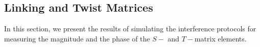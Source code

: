 \documentclass[two column]{article}
\begin{document}




\subsection{Linking and Twist Matrices}\label{sec:num:intef}

In this section, we present the results of simulating the interference protocols for measuring the magnitude and the phase of the $S-$ and $T-$matrix elements. 
\end{document}
